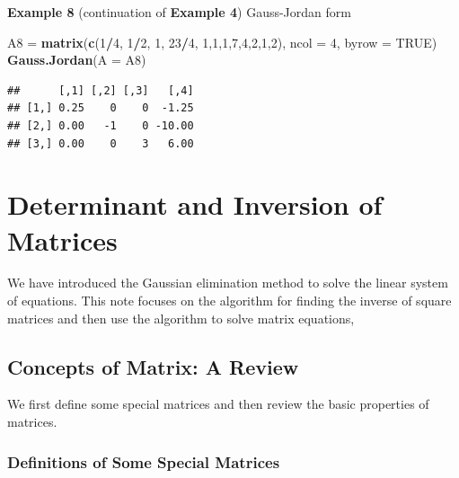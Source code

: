 \documentclass[
]{book}
\newenvironment{Shaded}{\begin{snugshade}}{\end{snugshade}}
\newcommand{\AttributeTok}[1]{\textcolor[rgb]{0.13,0.29,0.53}{#1}}
\newcommand{\ConstantTok}[1]{\textcolor[rgb]{0.56,0.35,0.01}{#1}}
\newcommand{\DecValTok}[1]{\textcolor[rgb]{0.00,0.00,0.81}{#1}}
\newcommand{\FunctionTok}[1]{\textcolor[rgb]{0.13,0.29,0.53}{\textbf{#1}}}
\newcommand{\NormalTok}[1]{#1}
\newcommand{\OtherTok}[1]{\textcolor[rgb]{0.56,0.35,0.01}{#1}}
\newcommand{\SpecialCharTok}[1]{\textcolor[rgb]{0.81,0.36,0.00}{\textbf{#1}}}
\begin{document}
\hfill\break

\textbf{Example 8} (continuation of \textbf{Example 4}) Gauss-Jordan form

\begin{Shaded}
\begin{Highlighting}[]
\NormalTok{A8 }\OtherTok{=} \FunctionTok{matrix}\NormalTok{(}\FunctionTok{c}\NormalTok{(}\DecValTok{1}\SpecialCharTok{/}\DecValTok{4}\NormalTok{, }\DecValTok{1}\SpecialCharTok{/}\DecValTok{2}\NormalTok{, }\DecValTok{1}\NormalTok{, }\DecValTok{23}\SpecialCharTok{/}\DecValTok{4}\NormalTok{, }\DecValTok{1}\NormalTok{,}\DecValTok{1}\NormalTok{,}\DecValTok{1}\NormalTok{,}\DecValTok{7}\NormalTok{,}\DecValTok{4}\NormalTok{,}\DecValTok{2}\NormalTok{,}\DecValTok{1}\NormalTok{,}\DecValTok{2}\NormalTok{), }\AttributeTok{ncol =} \DecValTok{4}\NormalTok{, }\AttributeTok{byrow =} \ConstantTok{TRUE}\NormalTok{)}
\FunctionTok{Gauss.Jordan}\NormalTok{(}\AttributeTok{A =}\NormalTok{ A8)}
\end{Highlighting}
\end{Shaded}

\begin{verbatim}
##      [,1] [,2] [,3]   [,4]
## [1,] 0.25    0    0  -1.25
## [2,] 0.00   -1    0 -10.00
## [3,] 0.00    0    3   6.00
\end{verbatim}

\hypertarget{determinant-and-inversion-of-matrices}{%
\chapter{Determinant and Inversion of Matrices}\label{determinant-and-inversion-of-matrices}}

We have introduced the Gaussian elimination method to solve the linear system of equations. This note focuses on the algorithm for finding the inverse of square matrices and then use the algorithm to solve matrix equations,

\hypertarget{concepts-of-matrix-a-review}{%
\section{Concepts of Matrix: A Review}\label{concepts-of-matrix-a-review}}

We first define some special matrices and then review the basic properties of matrices.

\hypertarget{definitions-of-some-special-matrices}{%
\subsection{Definitions of Some Special Matrices}\label{definitions-of-some-special-matrices}}
\end{document}
